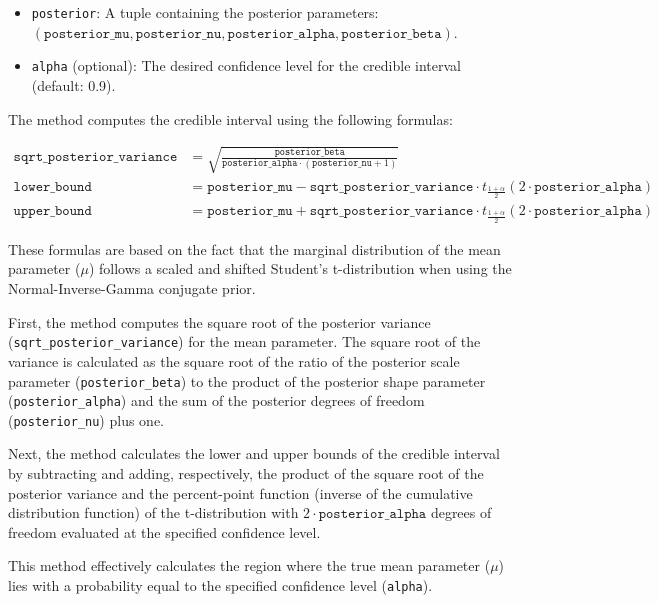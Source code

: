 \documentclass{article}
\begin{document}
\begin{itemize}
    \item \texttt{posterior}: A tuple containing the posterior parameters: $(\texttt{posterior\_mu}, \texttt{posterior\_nu}, \texttt{posterior\_alpha}, \texttt{posterior\_beta})$.
    \item \texttt{alpha} (optional): The desired confidence level for the credible interval (default: 0.9).
\end{itemize}

The method computes the credible interval using the following formulas:

\begin{align*}
    \texttt{sqrt\_posterior\_variance} &= \sqrt{\frac{\texttt{posterior\_beta}}{\texttt{posterior\_alpha} \cdot (\texttt{posterior\_nu} + 1)}} \\
    \texttt{lower\_bound} &= \texttt{posterior\_mu} - \texttt{sqrt\_posterior\_variance} \cdot t_{\frac{1 + \alpha}{2}}(2 \cdot \texttt{posterior\_alpha}) \\
    \texttt{upper\_bound} &= \texttt{posterior\_mu} + \texttt{sqrt\_posterior\_variance} \cdot t_{\frac{1 + \alpha}{2}}(2 \cdot \texttt{posterior\_alpha})
\end{align*}

These formulas are based on the fact that the marginal distribution of the mean parameter ($\mu$) follows a scaled and shifted Student's t-distribution when using the Normal-Inverse-Gamma conjugate prior.

First, the method computes the square root of the posterior variance (\texttt{sqrt\_posterior\_variance}) for the mean parameter. The square root of the variance is calculated as the square root of the ratio of the posterior scale parameter (\texttt{posterior\_beta}) to the product of the posterior shape parameter (\texttt{posterior\_alpha}) and the sum of the posterior degrees of freedom (\texttt{posterior\_nu}) plus one.

Next, the method calculates the lower and upper bounds of the credible interval by subtracting and adding, respectively, the product of the square root of the posterior variance and the percent-point function (inverse of the cumulative distribution function) of the t-distribution with $2 \cdot \texttt{posterior\_alpha}$ degrees of freedom evaluated at the specified confidence level.

This method effectively calculates the region where the true mean parameter ($\mu$) lies with a probability equal to the specified confidence level (\texttt{alpha}).
\end{document}

